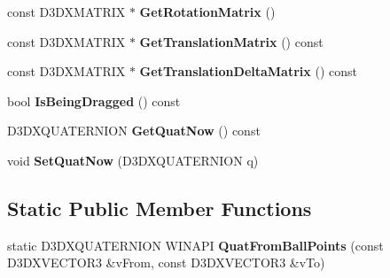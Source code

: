 \begin{DoxyCompactItemize}
\item 
\hypertarget{class_c_d3_d_arc_ball_a546036e679d57ea3258a4f77ba8b9df8}{const D3\+D\+X\+M\+A\+T\+R\+I\+X $\ast$ {\bfseries Get\+Rotation\+Matrix} ()}\label{class_c_d3_d_arc_ball_a546036e679d57ea3258a4f77ba8b9df8}

\item 
\hypertarget{class_c_d3_d_arc_ball_ad100e8818466d636d428e49fbe634f5b}{const D3\+D\+X\+M\+A\+T\+R\+I\+X $\ast$ {\bfseries Get\+Translation\+Matrix} () const }\label{class_c_d3_d_arc_ball_ad100e8818466d636d428e49fbe634f5b}

\item 
\hypertarget{class_c_d3_d_arc_ball_a4b402efbd90ff4f6fc916eadfcf61482}{const D3\+D\+X\+M\+A\+T\+R\+I\+X $\ast$ {\bfseries Get\+Translation\+Delta\+Matrix} () const }\label{class_c_d3_d_arc_ball_a4b402efbd90ff4f6fc916eadfcf61482}

\item 
\hypertarget{class_c_d3_d_arc_ball_ac7ca13b553ce0ecce4d375697d0866e3}{bool {\bfseries Is\+Being\+Dragged} () const }\label{class_c_d3_d_arc_ball_ac7ca13b553ce0ecce4d375697d0866e3}

\item 
\hypertarget{class_c_d3_d_arc_ball_ad256f4f111901c148228b745a274d828}{D3\+D\+X\+Q\+U\+A\+T\+E\+R\+N\+I\+O\+N {\bfseries Get\+Quat\+Now} () const }\label{class_c_d3_d_arc_ball_ad256f4f111901c148228b745a274d828}

\item 
\hypertarget{class_c_d3_d_arc_ball_ad3140af4e1b4f62a18238ac2991de9a6}{void {\bfseries Set\+Quat\+Now} (D3\+D\+X\+Q\+U\+A\+T\+E\+R\+N\+I\+O\+N q)}\label{class_c_d3_d_arc_ball_ad3140af4e1b4f62a18238ac2991de9a6}

\end{DoxyCompactItemize}
\subsection*{Static Public Member Functions}
\begin{DoxyCompactItemize}
\item 
\hypertarget{class_c_d3_d_arc_ball_ab4ab2df9ad0ee6239a79bc826dc35249}{static D3\+D\+X\+Q\+U\+A\+T\+E\+R\+N\+I\+O\+N W\+I\+N\+A\+P\+I {\bfseries Quat\+From\+Ball\+Points} (const D3\+D\+X\+V\+E\+C\+T\+O\+R3 \&v\+From, const D3\+D\+X\+V\+E\+C\+T\+O\+R3 \&v\+To)}\label{class_c_d3_d_arc_ball_ab4ab2df9ad0ee6239a79bc826dc35249}

\end{DoxyCompactItemize}
